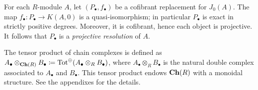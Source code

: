 \begin{refsection}
\begin{eg}
For each $R$-module $A$, let $(P_\bullet,f_\bullet)$ be a cofibrant replacement for $J_0(A)$. The map $f_\bullet \colon P_\bullet \to K(A,0)$ is a quasi-isomorphism; in particular $P_\bullet$ is exact in strictly positive degrees. Moreover, it is cofibrant, hence each object is projective. It follows that $P_\bullet$ is a \emph{projective resolution} of $A$.
\end{eg}

\begin{rmk}
The tensor product of chain complexes is defined as $A_\bullet \otimes_{\mathbf{Ch}(R)} B_\bullet\coloneqq \operatorname{\mathrm{Tot}}^\oplus(A_\bullet \otimes_R B_\bullet)$, where $A_\bullet \otimes_R B_\bullet$ is the natural double complex associated to $A_\bullet$ and $B_\bullet$. This tensor product endows $\mathbf{Ch}(R)$ with a monoidal structure. See the appendixes for the details.
\end{rmk}


\end{refsection}
